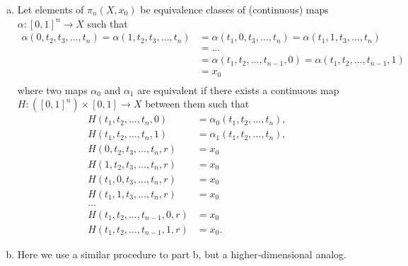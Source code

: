 \documentclass{article}
\newenvironment{solution}[1][Solution.]{\begin{trivlist}
\item[\hskip \labelsep {\bfseries #1}]}{\end{trivlist}}
\begin{document}
\begin{solution}
\begin{enumerate}[a.]
    (I ran out of time.)
    \item Let elements of $\pi_n(X, x_0)$ be equivalence classes of
      (continuous) maps $\alpha\colon [0,1]^n \rightarrow X$ such
      that \begin{align*}
        \alpha(0, t_2, t_3, \hdots, t_n) = \alpha(1, t_2, t_3, \hdots, t_n)
        &= \alpha(t_1, 0, t_3, \hdots, t_n) = \alpha(t_1, 1, t_3, \hdots, t_n) \\
        &= \hdots \\
        &= \alpha(t_1, t_2, \hdots, t_{n-1}, 0) = \alpha(t_1, t_2, \hdots, t_{n-1}, 1)  \\
        &= x_0 \\
      \end{align*} where two maps $\alpha_0$ and $\alpha_1$ are equivalent if there exists a
      continuous map $H\colon ([0, 1]^n) \times [0, 1] \rightarrow X$
      between them such that \begin{align*}
        H(t_1, t_2, \hdots, t_n, 0) &= \alpha_0(t_1, t_2, \hdots, t_n), \\
        H(t_1, t_2, \hdots, t_n, 1) &= \alpha_1(t_1, t_2, \hdots, t_n), \\
        H(0, t_2, t_3, \hdots, t_n, r) &= x_0 \\
        H(1, t_2, t_3, \hdots, t_n, r) &= x_0 \\
        H(t_1, 0, t_3, \hdots, t_n, r) &= x_0 \\
        H(t_1, 1, t_3, \hdots, t_n, r) &= x_0 \\
        \hdots \\
        H(t_1, t_2, \hdots, t_{n-1}, 0, r) &= x_0 \\
        H(t_1, t_2, \hdots, t_{n-1}, 1, r) &= x_0.
      \end{align*}
    \item Here we use a similar procedure to part b, but a higher-dimensional analog.

  \end{enumerate}
\end{solution}
\end{document}
